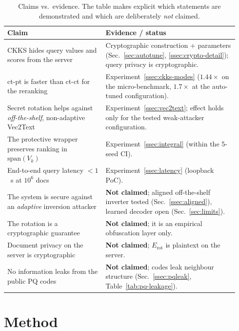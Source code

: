 \documentclass[11pt,a4paper]{article}
\begin{document}
\begin{table}[t]
\centering
\caption{Claims vs.\ evidence. The table makes explicit which statements
are demonstrated and which are deliberately \emph{not} claimed.}
\label{tab:claims}
\small
\begin{tabular}{@{}p{0.40\linewidth}p{0.54\linewidth}@{}}
\toprule
\textbf{Claim} & \textbf{Evidence / status} \\ \midrule
CKKS hides query values and scores from the server &
Cryptographic construction + parameters (Sec.~\ref{sec:autotune},
\ref{ssec:crypto-detail}); query privacy is cryptographic. \\
ct-pt is faster than ct-ct for the reranking &
Experiment~\ref{ssec:ckks-modes} ($1.44\times$ on the micro-benchmark,
$1.7\times$ at the auto-tuned configuration). \\
Secret rotation helps against \emph{off-the-shelf}, non-adaptive
Vec2Text & Experiment~\ref{ssec:vec2text}; effect holds only for the
tested weak-attacker configuration. \\
The protective wrapper preserves ranking in $\mathrm{span}(V_k)$ &
Experiment~\ref{ssec:integral} (within the 5-seed CI). \\
End-to-end query latency $<1$~s at $10^6$ docs &
Experiment~\ref{ssec:latency} (loopback PoC). \\
The system is secure against an \emph{adaptive} inversion attacker &
\textbf{Not claimed}; aligned off-the-shelf inverter tested
(Sec.~\ref{ssec:aligned}), learned decoder open (Sec.~\ref{sec:limits}). \\
The rotation is a cryptographic guarantee &
\textbf{Not claimed}; it is an empirical obfuscation layer only. \\
Document privacy on the server is cryptographic &
\textbf{Not claimed}; $E_{\mathrm{rot}}$ is plaintext on the server. \\
No information leaks from the public PQ codes &
\textbf{Not claimed}; codes leak neighbour structure
(Sec.~\ref{ssec:pqleak}, Table~\ref{tab:pq-leakage}). \\
\bottomrule
\end{tabular}
\end{table}

\section{Method}\label{sec:method}
\end{document}
